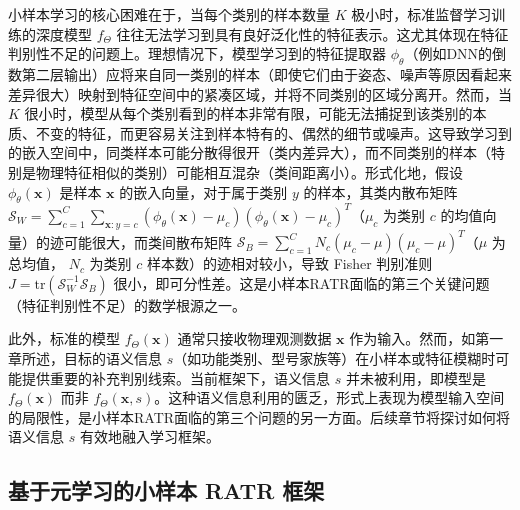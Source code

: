小样本学习的核心困难在于，当每个类别的样本数量 $K$ 极小时，标准监督学习训练的深度模型 $f_\Theta$ 往往无法学习到具有良好泛化性的特征表示。这尤其体现在特征判别性不足的问题上。理想情况下，模型学习到的特征提取器 $\phi_\theta$（例如DNN的倒数第二层输出）应将来自同一类别的样本（即使它们由于姿态、噪声等原因看起来差异很大）映射到特征空间中的紧凑区域，并将不同类别的区域分离开。然而，当 $K$ 很小时，模型从每个类别看到的样本非常有限，可能无法捕捉到该类别的本质、不变的特征，而更容易关注到样本特有的、偶然的细节或噪声。这导致学习到的嵌入空间中，同类样本可能分散得很开（类内差异大），而不同类别的样本（特别是物理特征相似的类别）可能相互混杂（类间距离小）。形式化地，假设 $\phi_\theta(\mathbf{x})$ 是样本 $\mathbf{x}$ 的嵌入向量，对于属于类别 $y$ 的样本，其类内散布矩阵 $\mathcal{S}_W = \sum_{c=1}^C \sum_{\mathbf{x}: y=c} (\phi_\theta(\mathbf{x}) - \mu_c)(\phi_\theta(\mathbf{x}) - \mu_c)^T$（$\mu_c$ 为类别 $c$ 的均值向量）的迹可能很大，而类间散布矩阵 $\mathcal{S}_B = \sum_{c=1}^C N_c (\mu_c - \mu)(\mu_c - \mu)^T$（$\mu$ 为总均值， $N_c$ 为类别 $c$ 样本数）的迹相对较小，导致 Fisher 判别准则 $J = \text{tr}(\mathcal{S}_W^{-1} \mathcal{S}_B)$ 很小，即可分性差。这是小样本RATR面临的第三个关键问题（特征判别性不足）的数学根源之一。

此外，标准的模型 $f_\Theta(\mathbf{x})$ 通常只接收物理观测数据 $\mathbf{x}$ 作为输入。然而，如第一章所述，目标的语义信息 $s$（如功能类别、型号家族等）在小样本或特征模糊时可能提供重要的补充判别线索。当前框架下，语义信息 $s$ 并未被利用，即模型是 $f_\Theta(\mathbf{x})$ 而非 $f_\Theta(\mathbf{x}, s)$。这种语义信息利用的匮乏，形式上表现为模型输入空间的局限性，是小样本RATR面临的第三个问题的另一方面。后续章节将探讨如何将语义信息 $s$ 有效地融入学习框架。

\subsection{基于元学习的小样本 RATR 框架}
\label{subsec:meta_learning_framework}

